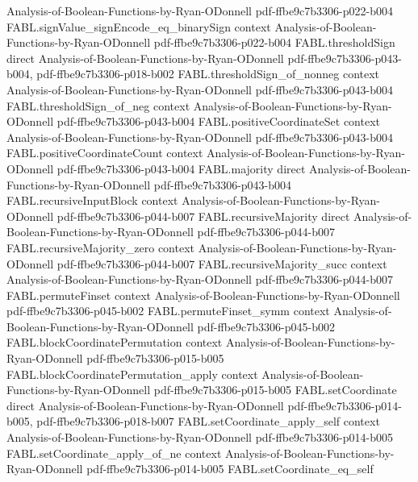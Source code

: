\begin{theorem}
  {Analysis-of-Boolean-Functions-by-Ryan-ODonnell}
  {pdf-ffbe9c7b3306-p022-b004}
\proofstep
  {FABL.signValue_signEncode_eq_binarySign}
  {context}
  {Analysis-of-Boolean-Functions-by-Ryan-ODonnell}
  {pdf-ffbe9c7b3306-p022-b004}
\proofstep
  {FABL.thresholdSign}
  {direct}
  {Analysis-of-Boolean-Functions-by-Ryan-ODonnell}
  {pdf-ffbe9c7b3306-p043-b004,
    pdf-ffbe9c7b3306-p018-b002}
\proofstep
  {FABL.thresholdSign_of_nonneg}
  {context}
  {Analysis-of-Boolean-Functions-by-Ryan-ODonnell}
  {pdf-ffbe9c7b3306-p043-b004}
\proofstep
  {FABL.thresholdSign_of_neg}
  {context}
  {Analysis-of-Boolean-Functions-by-Ryan-ODonnell}
  {pdf-ffbe9c7b3306-p043-b004}
\proofstep
  {FABL.positiveCoordinateSet}
  {context}
  {Analysis-of-Boolean-Functions-by-Ryan-ODonnell}
  {pdf-ffbe9c7b3306-p043-b004}
\proofstep
  {FABL.positiveCoordinateCount}
  {context}
  {Analysis-of-Boolean-Functions-by-Ryan-ODonnell}
  {pdf-ffbe9c7b3306-p043-b004}
\proofstep
  {FABL.majority}
  {direct}
  {Analysis-of-Boolean-Functions-by-Ryan-ODonnell}
  {pdf-ffbe9c7b3306-p043-b004}
\proofstep
  {FABL.recursiveInputBlock}
  {context}
  {Analysis-of-Boolean-Functions-by-Ryan-ODonnell}
  {pdf-ffbe9c7b3306-p044-b007}
\proofstep
  {FABL.recursiveMajority}
  {direct}
  {Analysis-of-Boolean-Functions-by-Ryan-ODonnell}
  {pdf-ffbe9c7b3306-p044-b007}
\proofstep
  {FABL.recursiveMajority_zero}
  {context}
  {Analysis-of-Boolean-Functions-by-Ryan-ODonnell}
  {pdf-ffbe9c7b3306-p044-b007}
\proofstep
  {FABL.recursiveMajority_succ}
  {context}
  {Analysis-of-Boolean-Functions-by-Ryan-ODonnell}
  {pdf-ffbe9c7b3306-p044-b007}
\proofstep
  {FABL.permuteFinset}
  {context}
  {Analysis-of-Boolean-Functions-by-Ryan-ODonnell}
  {pdf-ffbe9c7b3306-p045-b002}
\proofstep
  {FABL.permuteFinset_symm}
  {context}
  {Analysis-of-Boolean-Functions-by-Ryan-ODonnell}
  {pdf-ffbe9c7b3306-p045-b002}
\proofstep
  {FABL.blockCoordinatePermutation}
  {context}
  {Analysis-of-Boolean-Functions-by-Ryan-ODonnell}
  {pdf-ffbe9c7b3306-p015-b005}
\proofstep
  {FABL.blockCoordinatePermutation_apply}
  {context}
  {Analysis-of-Boolean-Functions-by-Ryan-ODonnell}
  {pdf-ffbe9c7b3306-p015-b005}
\proofstep
  {FABL.setCoordinate}
  {direct}
  {Analysis-of-Boolean-Functions-by-Ryan-ODonnell}
  {pdf-ffbe9c7b3306-p014-b005,
    pdf-ffbe9c7b3306-p018-b007}
\proofstep
  {FABL.setCoordinate_apply_self}
  {context}
  {Analysis-of-Boolean-Functions-by-Ryan-ODonnell}
  {pdf-ffbe9c7b3306-p014-b005}
\proofstep
  {FABL.setCoordinate_apply_of_ne}
  {context}
  {Analysis-of-Boolean-Functions-by-Ryan-ODonnell}
  {pdf-ffbe9c7b3306-p014-b005}
\proofstep
  {FABL.setCoordinate_eq_self}

\end{theorem}
